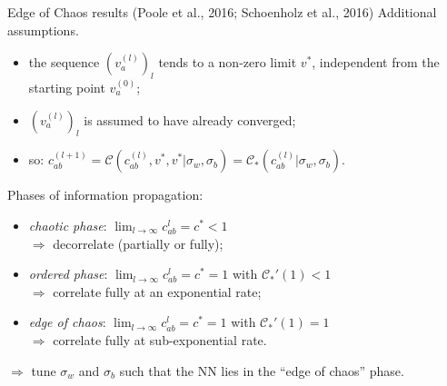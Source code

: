 \documentclass[9pt,handout]{beamer}
\begin{document}
\begin{frame}{Edge of Chaos results (Poole et al., 2016; Schoenholz et al., 2016)}
	\alert{Additional assumptions.}
	\begin{itemize}
		\item the sequence $(v_a^{(l)})_l$ tends to a non-zero limit $v^*$, independent from the starting point 
		$v_a^{(0)}$;
		\item $(v_a^{(l)})_l$ is assumed to have already converged; 
		\item so: $c_{ab}^{(l + 1)} = \mathcal{C}(c_{ab}^{(l)}, v^*, v^* | \sigma_w, \sigma_b) = 
		\mathcal{C}_*(c_{ab}^{(l)} | \sigma_w, \sigma_b)$.
	\end{itemize} 
	
	\medskip
	
	\alert{Phases of information propagation:}
	\begin{itemize}
		\item \emph{chaotic phase}: $\lim_{l \rightarrow \infty} c_{ab}^{l} = c^{*} < 1$ \\
			$\Rightarrow$ decorrelate (partially or fully);
		\item \emph{ordered phase}: $\lim_{l \rightarrow \infty} c_{ab}^{l} = c^{*} = 1$ with 
		$\mathcal{C}_*'(1) < 1$ \\
			$\Rightarrow$ correlate fully at an exponential rate;
		\item \emph{edge of chaos}: $\lim_{l \rightarrow \infty} c_{ab}^{l} = c^{*} = 1$ with 
		$\mathcal{C}_*'(1) = 1$ \\
			$\Rightarrow$ correlate fully at sub-exponential rate. 
	\end{itemize}
	$\Rightarrow$ tune $\sigma_w$ and $\sigma_b$ such that the NN lies in the ``edge of chaos'' phase.
\end{frame}
\end{document}
